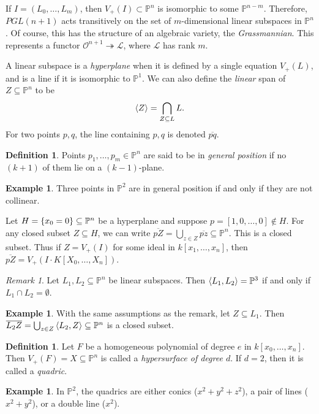 \documentclass[leqno, openany]{memoir}
\theoremstyle{definition}
\newtheorem{defn}[thm]{Definition}
\newtheorem{exm}[thm]{Example}
\theoremstyle{remark}
\newtheorem{rmk}[thm]{Remark}
\theoremstyle{plain}
\theoremstyle{definition}
\theoremstyle{remark}
\renewcommand{\P}{\mathbb{P}}
\newcommand{\mc}[1]{\mathcal{#1}}
\newcommand{\ol}[1]{\overline{#1}}
\begin{document}
If $I = (L_0, \ldots, L_m)$, then $V_+(I) \subset \P^n$ is isomorphic to some
$\P^{n-m}$. Therefore, $PGL(n+1)$ acts transitively on the set of
$m$-dimensional linear subspaces in $\P^n$. Of course, this has the structure
of an algebraic variety, the \textit{Grassmannian}. This represents a functor
$\mc{O}^{n+1} \twoheadrightarrow \mc{L}$, where $\mc{L}$ has rank $m$. 

A linear subspace is a \textit{hyperplane} when it is defined by a single
equation $V_+(L)$, and is a line if it is isomorphic to $\P^1$. We can also
define the \textit{linear} span of $Z \subseteq \P^n$ to be \[ \ev{Z} =
\bigcap_{Z \subseteq L} L. \] For two points $p,q$, the line containing $p,q$
is denoted $\ol{pq}$.

\begin{defn} Points $p_1, \ldots, p_m \in \P^n$ are said to be in
\textit{general position} if no $(k+1)$ of them lie on a $(k-1)$-plane.
\end{defn}

\begin{exm} Three points in $\P^2$ are in general position if and only if they
are not collinear.  \end{exm}

Let $H = \qty{x_0 = 0} \subseteq \P^n$ be a hyperplane and suppose $p =
[1,0,\ldots,0] \notin H$. For any closed subset $Z \subseteq H$, we can write
$\ol{pZ} = \bigcup_{z \in Z} \ol{pz} \subseteq \P^n$. This is a closed subset.
Thus if $Z = V_+(I)$ for some ideal in $k[x_1, \ldots, x_n]$, then $\ol{pZ} =
V_+(I \cdot K[X_0, \ldots, X_n])$.

\begin{rmk} Let $L_1, L_2 \subseteq \P^n$ be linear subspaces. Then $\ev{L_1,
L_2} = \P^3$ if and only if $L_1 \cap L_2 = \emptyset$.  \end{rmk}

\begin{exm} With the same assumptions as the remark, let $Z \subseteq L_1$.
Then $\ol{L_2 Z} = \bigcup_{z \in Z} \ev{L_2, Z} \subseteq \P^n$ is a closed
subset.  \end{exm}

\begin{defn} Let $F$ be a homogeneous polynomial of degree $e$ in $k[x_0,
\ldots, x_n]$. Then $V_+(F) = X \subseteq \P^n$ is called a
\textit{hypersurface of degree $d$}. If $d=2$, then it is called a
\textit{quadric}.  \end{defn}

\begin{exm} In $\P^2$, the quadrics are either conics ($x^2+y^2+z^2$), a pair
of lines ($x^2+y^2$), or a double line ($x^2$).  \end{exm}
\end{document}
